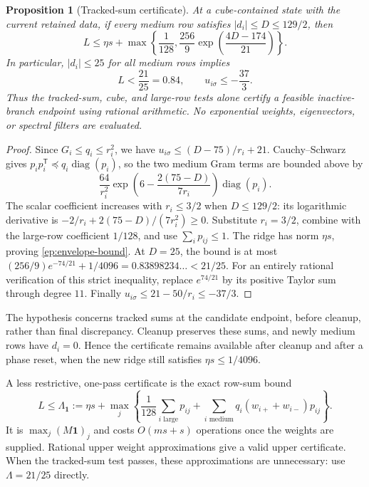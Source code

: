 \documentclass[11pt]{amsart}
\newtheorem{proposition}[theorem]{Proposition}
\theoremstyle{definition}\newtheorem{definition}[theorem]{Definition}
\theoremstyle{remark}\newtheorem{remark}[theorem]{Remark}
\numberwithin{equation}{section}
\newcommand{\diag}{\operatorname{diag}}
\newcommand{\one}{\mathbf1}
\newcommand{\T}{\mathsf T}
\begin{document}
\begin{proposition}[Tracked-sum certificate]\label{ep:envelope}
At a cube-contained state with the current retained data, if every
medium row satisfies $|d_i|\le D\le129/2$, then
\begin{equation}\label{ep:envelope-bound}
 L\le\eta s+\max\left\{\frac1{128},
      \frac{256}{9}\exp\left(\frac{4D-174}{21}\right)\right\}.
\end{equation}
In particular, $|d_i|\le25$ for all medium rows implies
\[
 L<\frac{21}{25}=0.84,\qquad u_{i\sigma}\le-\frac{37}{3}.
\]
Thus the tracked-sum, cube, and large-row tests alone certify a feasible
inactive-branch endpoint using rational arithmetic. No exponential
weights, eigenvectors, or spectral filters are evaluated.
\end{proposition}
\begin{proof}
Since $G_i\le q_i\le r_i^2$, we have
$u_{i\sigma}\le(D-75)/r_i+21$. Cauchy--Schwarz gives
$p_ip_i^\T\preceq q_i\diag(p_i)$, so the two medium Gram terms are
bounded above by
\[
 \frac{64}{r_i^2}
   \exp\left(6-\frac{2(75-D)}{7r_i}\right)\diag(p_i).
\]
The scalar coefficient increases with $r_i\le3/2$ when $D\le129/2$:
its logarithmic derivative is
$-2/r_i+2(75-D)/(7r_i^2)\ge0$. Substitute $r_i=3/2$, combine with
the large-row coefficient $1/128$, and use $\sum_i p_{ij}\le1$.
The ridge has norm $\eta s$, proving \eqref{ep:envelope-bound}.
At $D=25$, the bound is at most
$(256/9)e^{-74/21}+1/4096=0.83898234\ldots<21/25$.
For an entirely rational verification of this strict inequality,
replace $e^{74/21}$ by its positive Taylor sum through degree $11$.
Finally $u_{i\sigma}\le21-50/r_i\le-37/3$.
\end{proof}

The hypothesis concerns tracked sums at the candidate endpoint,
before cleanup, rather than final discrepancy. Cleanup preserves these
sums, and newly medium rows have $d_i=0$. Hence the certificate remains
available after cleanup and after a phase reset, when the new ridge
still satisfies $\eta s\le1/4096$.

A less restrictive, one-pass certificate is the exact row-sum bound
\begin{equation}\label{ep:rowsum}
 L\le\Lambda_{\one}:=\eta s+
 \max_j\left\{\frac1{128}\sum_{i\text{ large}}p_{ij}
       +\sum_{i\text{ medium}}q_i(w_{i+}+w_{i-})p_{ij}\right\}.
\end{equation}
It is $\max_j(M\one)_j$ and costs $O(ms+s)$ operations once the
weights are supplied. Rational upper weight approximations give a
valid upper certificate. When the tracked-sum test passes, these
approximations are unnecessary: use $\Lambda=21/25$ directly.
\end{document}
